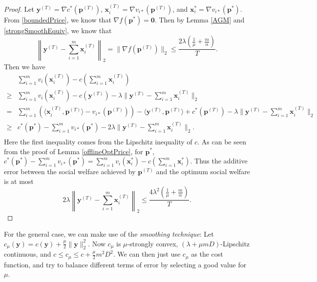 \documentclass{article}
\begin{document}
\begin{proof}
    Let $\mathbf{y}^{(T)}=\nabla c^*(\mathbf{p}^{(T)})$, $\mathbf{x}_{i}^{(T)}=\nabla v_{i*}(\mathbf{p}^{(T)})$, and $\mathbf{x}_i^*=\nabla v_{i*}(\mathbf{p}^*)$. From \eqref{boundedPrice}, we know that $\nabla f(\mathbf{p}^*)=\mathbf{0}$. Then by Lemma \ref{AGM} and \ref{strongSmoothEquiv}, we know that
    \begin{equation}
        \left\|\mathbf{y}^{(T)}-\sum_{i=1}^{m}\mathbf{x}_{i}^{(T)}\right\|_2=\|\nabla f(\mathbf{p}^{(T)})\|_2\le \frac{2\lambda(\frac{1}{\mu}+\frac{m}{\alpha})}{T}.
    \end{equation}
    Then we have
    \begin{equation}
        \begin{array}{cl}
             & \sum_{i=1}^{m}v_i(\mathbf{x}_{i}^{(T)})-c(\sum_{i=1}^{m}\mathbf{x}_{i}^{(T)}) \\
            \ge & \sum_{i=1}^{m}v_i(\mathbf{x}_{i}^{(T)})-c(\mathbf{y}^{(T)})-\lambda\|\mathbf{y}^{(T)}-\sum_{i=1}^{m}\mathbf{x}_{i}^{(T)}\|_2 \\
            = & \sum_{i=1}^{m}(\langle \mathbf{x}_{i}^{(T)},\mathbf{p}^{(T)}\rangle-v_{i*}(\mathbf{p}^{(T)}))-\langle \mathbf{y}^{(T)},\mathbf{p}^{(T)}\rangle+c^*(\mathbf{p}^{(T)})-\lambda\|\mathbf{y}^{(T)}-\sum_{i=1}^{m}\mathbf{x}_{i}^{(T)}\|_2 \\
            \ge & c^*(\mathbf{p}^*)-\sum_{i=1}^{m}v_{i*}(\mathbf{p}^*)-2\lambda\|\mathbf{y}^{(T)}-\sum_{i=1}^{m}\mathbf{x}_{i}^{(T)}\|_2. \\
        \end{array}
    \end{equation}
    Here the first inequality comes from the Lipschitz inequality of $c$. As can be seen from the proof of Lemma \ref{offlineOptPrice}, for $\mathbf{p}^*$, $c^*(\mathbf{p}^*)-\sum_{i=1}^{m}v_{i*}(\mathbf{p}^*)=\sum_{i=1}^{m}v_i(\mathbf{x}_i^*)-c(\sum_{i=1}^{m}\mathbf{x}_i^*)$. Thus the additive error between the social welfare achieved by $\mathbf{p}^{(T)}$ and the optimum social welfare is at most
    \begin{equation}
        2\lambda\left\|\mathbf{y}^{(T)}-\sum_{i=1}^{m}\mathbf{x}_{i}^{(T)}\right\|_2\le \frac{4\lambda^2(\frac{1}{\mu}+\frac{m}{\alpha})}{T}.
    \end{equation}
\end{proof}

For the general case, we can make use of the \emph{smoothing technique}: Let $c_{\mu}(\mathbf{y})=c(\mathbf{y})+\frac{\mu}{2}\|\mathbf{y}\|_2^2$. Now $c_{\mu}$ is $\mu$-strongly convex, $(\lambda+\mu mD)$-Lipschitz continuous, and $c\le c_{\mu}\le c+\frac{\mu}{2}m^2D^2$. We can then just use $c_{\mu}$ as the cost function, and try to balance different terms of error by selecting a good value for $\mu$.
\end{document}
